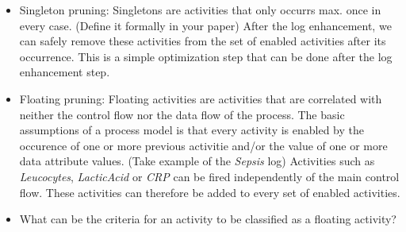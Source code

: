 \documentclass[a4paper,11pt,twoside]{pads-thesis}
\begin{document}
\begin{itemize}
        \item Singleton pruning: Singletons are activities that only occurrs max. once in every case. (Define it formally in your paper) After the log enhancement, we can safely remove these activities from the set of enabled activities after its occurrence. This is a simple optimization step that can be done after the log enhancement step.
        
        \item Floating pruning: Floating activities are activities that are correlated with neither the control flow nor the data flow of the process. The basic assumptions of a process model is that every activity is enabled by the occurence of one or more previous activitie and/or the value of one or more data attribute values. (Take example of the \emph{Sepsis} log) Activities such as \emph{Leucocytes}, \emph{LacticAcid} or \emph{CRP} can be fired independently of the main control flow. These activities can therefore be added to every set of enabled activities.
        
        \item What can be the criteria for an activity to be classified as a floating activity?
        

    \end{itemize}
    
\end{document}
